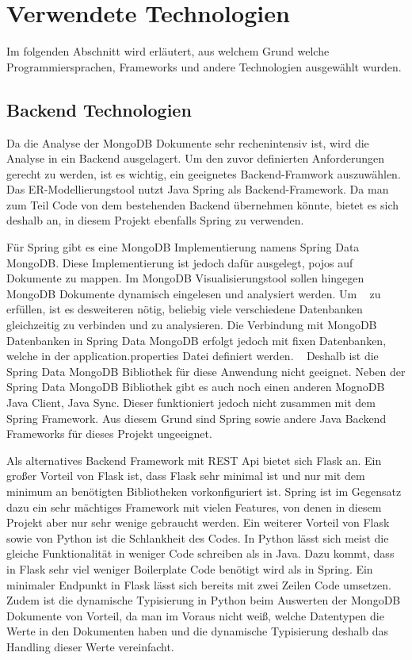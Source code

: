 \section{Verwendete Technologien}
\label{sec:verwendete_technologien}

Im folgenden Abschnitt wird erläutert, aus welchem Grund welche Programmiersprachen, Frameworks und andere Technologien ausgewählt wurden.

\subsection{Backend Technologien}
\label{sec:verwendete_technologien_backend}

Da die Analyse der MongoDB Dokumente sehr rechenintensiv ist, wird die Analyse in ein Backend ausgelagert.
Um den zuvor definierten Anforderungen gerecht zu werden, ist es wichtig, ein geeignetes Backend-Framwork auszuwählen.
Das ER-Modellierungstool nutzt Java Spring als Backend-Framework.
Da man zum Teil Code von dem bestehenden Backend übernehmen könnte, bietet es sich deshalb an, in diesem Projekt ebenfalls Spring zu verwenden.

Für Spring gibt es eine MongoDB Implementierung namens Spring Data MongoDB.
Diese Implementierung ist jedoch dafür ausgelegt, \ac{pojo}s auf Dokumente zu mappen.
Im MongoDB Visualisierungstool sollen hingegen MongoDB Dokumente dynamisch eingelesen und analysiert werden.
Um ~ zu erfüllen, ist es desweiteren nötig, beliebig viele verschiedene Datenbanken gleichzeitig zu verbinden und zu analysieren.
Die Verbindung mit MongoDB Datenbanken in Spring Data MongoDB erfolgt jedoch mit fixen Datenbanken, welche in der application.properties Datei definiert werden.
~\autocite{spring:spring-data-mongodb}
Deshalb ist die Spring Data MongoDB Bibliothek für diese Anwendung nicht geeignet.
Neben der Spring Data MongoDB Bibliothek gibt es auch noch einen anderen MognoDB Java Client, Java Sync.
Dieser funktioniert jedoch nicht zusammen mit dem Spring Framework.
Aus diesem Grund sind Spring sowie andere Java Backend Frameworks für dieses Projekt ungeeignet.

Als alternatives Backend Framework mit REST Api bietet sich Flask an.
Ein großer Vorteil von Flask ist, dass Flask sehr minimal ist und nur mit dem minimum an benötigten Bibliotheken vorkonfiguriert ist.
Spring ist im Gegensatz dazu ein sehr mächtiges Framework mit vielen Features, von denen in diesem Projekt aber nur sehr wenige gebraucht werden.
Ein weiterer Vorteil von Flask sowie von Python ist die Schlankheit des Codes.
In Python lässt sich meist die gleiche Funktionalität in weniger Code schreiben als in Java.
Dazu kommt, dass in Flask sehr viel weniger Boilerplate Code benötigt wird als in Spring.
Ein minimaler Endpunkt in Flask lässt sich bereits mit zwei Zeilen Code umsetzen.
Zudem ist die dynamische Typisierung in Python beim Auswerten der MongoDB Dokumente von Vorteil, da man im Voraus nicht weiß, welche Datentypen die Werte in den Dokumenten haben und die dynamische Typisierung deshalb das Handling dieser Werte vereinfacht.
~\autocite{khoirom2020comparative}

